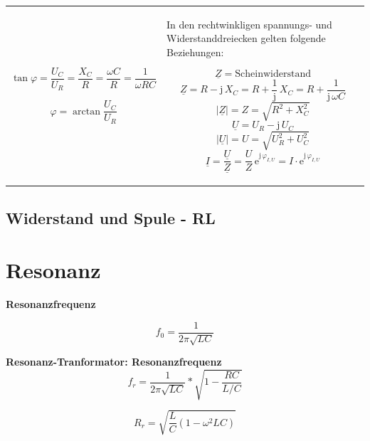 \documentclass[a4paper,12pt]{article}
\begin{document}
\begin{tabular}{p{} p{}}
    	$$
    	\tan\varphi = \frac{U_C}{U_R} = \frac{X_C}{R} = \frac{\omega C}{R} = \frac{1}{\omega RC}
    	$$
    
    	$$
    	\varphi = \arctan\frac{U_C}{U_R}
    	$$
    	
    	&
    	
    	\vspace{0pt}
    	In den rechtwinkligen spannungs- und Widerstanddreiecken gelten folgende Beziehungen:
    	
    	\vspace{0pt}
    	$$
    	\underline{Z} = \text{Scheinwiderstand}
    	$$
    	$$
    	\underline{Z} = R - \mathrm{j}\, X_C = R + \frac{1}{\mathrm{j}}\, X_C = R + \frac{1}{\mathrm{j}\,\omega C}
    	$$
    	$$
    	|\underline{Z}| = Z = \sqrt{R^2 + X_C^2}
    	$$
    	$$
    	\underline{U} = U_R - \mathrm{j}\, U_C
    	$$
    	$$
    	|\underline{U}| = U = \sqrt{U_R^2 + U_C^2}
    	$$
    	$$
    	\underline{I} = \frac{\underline{U}}{\underline{Z}} = \frac{U}{Z}\,\mathrm{e}^{\mathrm{j}\,\varphi_{I,U}} = I \cdot \mathrm{e}^{\mathrm{j}\,\varphi_{I,U}}
    	$$
    	
    \end{tabular}
    
    \subsection{Widerstand und Spule - RL}
    
    \section{Resonanz}
    
    \textbf{Resonanzfrequenz}
    
    $$f_0 = \frac{1}{2\pi\sqrt{LC}}$$
    
    \textbf{Resonanz-Tranformator: Resonanzfrequenz}
    $$f_r=\frac{1}{2\pi\sqrt{LC}}*\sqrt{1-\frac{RC}{L/C}}$$
    
    $$R_r = \sqrt{\frac{L}{C}(1-\omega^2LC)}$$
    
\end{document}
